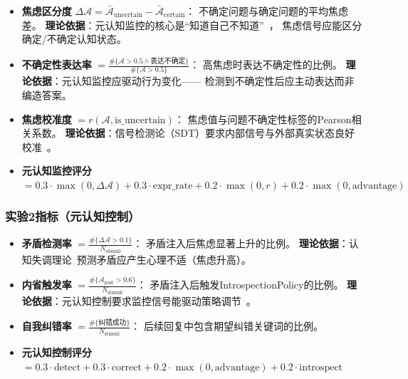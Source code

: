 \documentclass[11pt,a4paper]{article}
\newcommand{\anxiety}{\mathcal{A}}
\begin{document}
\begin{itemize}[leftmargin=2em]
    \item \textbf{焦虑区分度} $\Delta\anxiety = \bar{\anxiety}_{\text{uncertain}} - \bar{\anxiety}_{\text{certain}}$：
    不确定问题与确定问题的平均焦虑差。
    \textbf{理论依据}：元认知监控的核心是``知道自己不知道''~\cite{kawato2023metacognitive}，
    焦虑信号应能区分确定/不确定认知状态。

    \item \textbf{不确定性表达率} $= \frac{\#\{\anxiety > 0.5 \wedge \text{表达不确定}\}}{\#\{\anxiety > 0.5\}}$：
    高焦虑时表达不确定性的比例。
    \textbf{理论依据}：元认知监控应驱动行为变化——
    检测到不确定性后应主动表达而非编造答案。

    \item \textbf{焦虑校准度} $= r(\anxiety, \text{is\_uncertain})$：
    焦虑值与问题不确定性标签的Pearson相关系数。
    \textbf{理论依据}：信号检测论（SDT）要求内部信号与外部真实状态良好校准~\cite{kawato2023metacognitive}。

    \item \textbf{元认知监控评分} $= 0.3 \cdot \max(0, \Delta\anxiety) + 0.3 \cdot \text{expr\_rate} + 0.2 \cdot \max(0, r) + 0.2 \cdot \max(0, \text{advantage})$
\end{itemize}

\subsubsection{实验2指标（元认知控制）}

\begin{itemize}[leftmargin=2em]
    \item \textbf{矛盾检测率} $= \frac{\#\{\Delta\anxiety > 0.1\}}{N_{\text{stimuli}}}$：
    矛盾注入后焦虑显著上升的比例。
    \textbf{理论依据}：认知失调理论~\cite{festinger1957cognitive}预测矛盾应产生心理不适（焦虑升高）。

    \item \textbf{内省触发率} $= \frac{\#\{\anxiety_{\text{post}} > 0.6\}}{N_{\text{stimuli}}}$：
    矛盾注入后触发IntrospectionPolicy的比例。
    \textbf{理论依据}：元认知控制要求监控信号能驱动策略调节~\cite{kawato2023metacognitive}。

    \item \textbf{自我纠错率} $= \frac{\#\{\text{纠错成功}\}}{N_{\text{stimuli}}}$：
    后续回复中包含期望纠错关键词的比例。

    \item \textbf{元认知控制评分} $= 0.3 \cdot \text{detect} + 0.3 \cdot \text{correct} + 0.2 \cdot \max(0, \text{advantage}) + 0.2 \cdot \text{introspect}$
\end{itemize}
\end{document}
